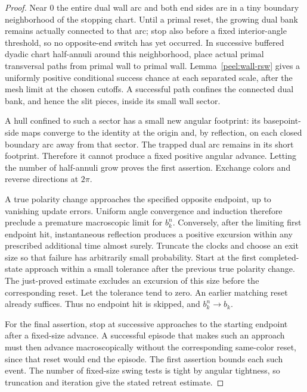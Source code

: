 \begin{proof}
Near $0$ the entire dual wall arc and both end sides are in a tiny
boundary neighborhood of the stopping chart.  Until a primal reset,
the growing dual bank remains actually connected to that arc; stop
also before a fixed interior-angle threshold, so no opposite-end
switch has yet occurred.  In successive buffered dyadic chart
half-annuli around this neighborhood, place actual primal transversal
paths from primal wall to primal wall.  Lemma~\ref{peel:wall-rsw}
gives a uniformly positive conditional success chance at each
separated scale, after the mesh limit at the chosen cutoffs.  A
successful path confines the connected dual bank, and hence the slit
pieces, inside its small wall sector.

A hull confined to such a sector has a small new angular footprint:
its basepoint-side maps converge to the identity at the origin and,
by reflection, on each closed boundary arc away from that sector.
The trapped dual arc remains in its short footprint.  Therefore it
cannot produce a fixed positive angular advance.  Letting the number
of half-annuli grow proves the first assertion.  Exchange colors and
reverse directions at $2\pi$.

A true polarity change approaches the specified opposite endpoint,
up to vanishing update errors.  Uniform angle convergence and induction
therefore preclude a premature macroscopic limit for $b_k^n$.
Conversely, after the limiting first endpoint hit, instantaneous
reflection produces a positive excursion within any prescribed
additional time almost surely.  Truncate the clocks and choose an
exit size so that failure has arbitrarily small probability.  Start
at the first completed-state approach within a small tolerance after
the previous true polarity change.  The just-proved estimate excludes
an excursion of this size before the corresponding reset.  Let the
tolerance tend to zero.  An earlier matching reset already suffices.
Thus no endpoint hit is skipped, and $b_k^n\to b_k$.

For the final assertion, stop at successive approaches to the starting
endpoint after a fixed-size advance.  A successful episode that makes
such an approach must then advance macroscopically without the
corresponding same-color reset, since that reset would end the episode.
The first assertion bounds each such event.  The number of fixed-size
swing tests is tight by angular tightness, so truncation and iteration
give the stated retreat estimate.
\end{proof}


